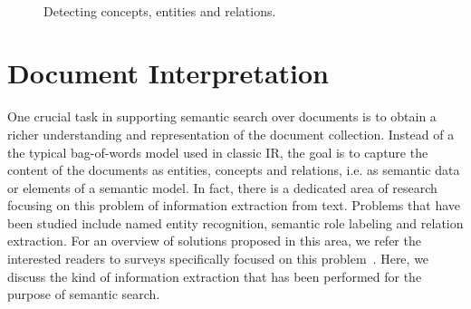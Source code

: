 
\begin{figure}[htb]
	\centering
  ~ %
  \caption{Detecting concepts, entities and relations.}
  \label{fig:extraction}
\end{figure}

\section{Document Interpretation}\label{sec:content}
	
One crucial task in supporting semantic search over documents is to obtain a richer understanding and representation of the document collection. Instead of a the typical bag-of-words model used in classic IR, the goal is to capture the content of the documents as entities, concepts and relations, i.e. as semantic data or elements of a semantic model. In fact, there is a dedicated area of research focusing on this problem of information extraction from text. Problems that have been studied include named entity recognition, semantic role labeling and relation extraction. For an overview of solutions proposed in this area, we refer the interested readers to surveys specifically focused on this problem~\cite{DBLP:journals/tkde/ChangKGS06}. Here, we discuss the kind of information extraction that has been performed for the purpose of semantic search. 

